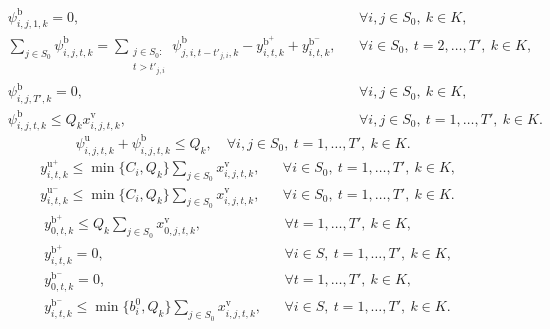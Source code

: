 \begin{subequations}\label{eq:broken-load}
\begin{align}
&\psi_{i,j,1,k}^{\mathrm{b}}
=0,
&&\forall i,j\in S_0,\ k\in K, \label{eq:broken-load-initial}\\
&\sum_{j\in S_0}\psi_{i,j,t,k}^{\mathrm{b}}
=\sum_{\substack{j\in S_0:\\ t>t'_{j,i}}}
\psi_{j,i,t-t'_{j,i},k}^{\mathrm{b}}
-y_{i,t,k}^{\mathrm{b}^{+}}
+y_{i,t,k}^{\mathrm{b}^{-}},
&&\forall i\in S_0,\ t=2,\ldots,T',\ k\in K, \label{eq:broken-load-balance}\\
&\psi_{i,j,T',k}^{\mathrm{b}}
=0,
&&\forall i,j\in S_0,\ k\in K, \label{eq:broken-load-final}\\
&\psi_{i,j,t,k}^{\mathrm{b}}
\le Q_k x_{i,j,t,k}^{\mathrm{v}},
&&\forall i,j\in S_0,\ t=1,\ldots,T',\ k\in K. \label{eq:broken-load-link}
\end{align}
\end{subequations}
\begin{equation}
\psi_{i,j,t,k}^{\mathrm{u}}+\psi_{i,j,t,k}^{\mathrm{b}}\le Q_k,
\quad \forall i,j\in S_0,\ t=1,\ldots,T',\ k\in K.
\label{eq:truck-capacity}
\end{equation}
\begin{subequations}\label{eq:truck-action-linking}
\begin{align}
&y_{i,t,k}^{\mathrm{u}^{+}}
\le \min\{C_i,Q_k\}\sum_{j\in S_0}x_{i,j,t,k}^{\mathrm{v}},
&&\forall i\in S_0,\ t=1,\ldots,T',\ k\in K, \label{eq:usable-delivery-link}\\
&y_{i,t,k}^{\mathrm{u}^{-}}
\le \min\{C_i,Q_k\}\sum_{j\in S_0}x_{i,j,t,k}^{\mathrm{v}},
&&\forall i\in S_0,\ t=1,\ldots,T',\ k\in K. \label{eq:usable-pickup-link}
\end{align}
\end{subequations}
\begin{subequations}\label{eq:broken-bike-rules}
\begin{align}
&y_{0,t,k}^{\mathrm{b}^{+}}
\le Q_k\sum_{j\in S_0}x_{0,j,t,k}^{\mathrm{v}},
&&\forall t=1,\ldots,T',\ k\in K, \label{eq:broken-depot-delivery-link}\\
&y_{i,t,k}^{\mathrm{b}^{+}}
=0,
&&\forall i\in S,\ t=1,\ldots,T',\ k\in K, \label{eq:no-broken-station-delivery}\\
&y_{0,t,k}^{\mathrm{b}^{-}}
=0,
&&\forall t=1,\ldots,T',\ k\in K, \label{eq:no-broken-depot-pickup}\\
&y_{i,t,k}^{\mathrm{b}^{-}}
\le \min\{b_i^0,Q_k\}\sum_{j\in S_0}x_{i,j,t,k}^{\mathrm{v}},
&&\forall i\in S,\ t=1,\ldots,T',\ k\in K. \label{eq:broken-station-pickup-link}
\end{align}
\end{subequations}
